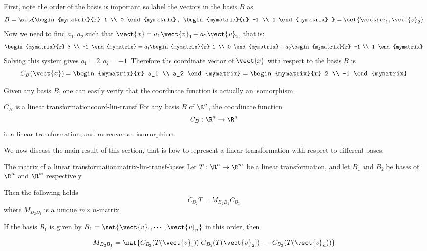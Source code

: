 \begin{solution}
First, note the order of the basis is important so label the vectors in the basis $B$ as 
\[
B = \set{\begin{mymatrix}{r}
1 \\
0 
\end{mymatrix}, \begin{mymatrix}{r}
-1 \\
1
\end{mymatrix} } = \set{\vect{v}_1, \vect{v}_2 } \]
Now we need to find $a_1, a_2$ such that $\vect{x} = a_1 \vect{v}_1 + a_2 \vect{v}_2$, that is:
\[
\begin{mymatrix}{r}
3 \\
-1
\end{mymatrix}
=
a_1 
\begin{mymatrix}{r}
1 \\
0 
\end{mymatrix}
+ a_2
\begin{mymatrix}{r}
-1 \\
1 
\end{mymatrix}\]
Solving this system gives $a_1 = 2, a_2 = -1$. Therefore the coordinate vector of $\vect{x}$ with respect to the basis $B$ is 
\[
C_B(\vect{x})
=
\begin{mymatrix}{r}
a_1 \\
a_2 
\end{mymatrix}
= \begin{mymatrix}{r}
2 \\
-1 
\end{mymatrix}
\]
\end{solution}

Given any basis $B$, one can easily verify that the coordinate function is actually an isomorphism. 

\begin{theorem}{$C_B$ is a linear transformation}{coord-lin-transf}
For any basis $B$ of $\R^n$, the coordinate function
\[ C_B: \R^n  \rightarrow \R^n  \]
is a linear transformation, and moreover an isomorphism. 
\end{theorem}

We now discuss the main  result  of this section, that is how
to represent a linear transformation with respect to different
bases.

\begin{theorem}{The matrix of a linear transformation}{matrix-lin-transf-bases}
Let $T: \R^n \to \R^m$ be a linear transformation,
and let $B_1$ and $B_2$ be bases of $\R^{n}$ and
$\R^{m}$ respectively.

Then the following holds
\begin{equation}
C_{B_2} T = M_{B_{2} B_{1}} C_{B_1}   \label{matrix-equation}
\end{equation}
where $M_{B_{2} B_{1}}$  is a unique $m \times n$-matrix.

If the basis $B_1$ is given by $B_1=\set{\vect{v}_1, \cdots, \vect{v}_n}$ in this order, then 

\[  M_{B_{2} B_{1}} = \mat{C_{B_2}(T(\vect{v}_1)) \; C_{B_2}(T(\vect{v}_2)) \; \cdots C_{B_2}(T(\vect{v}_n)) } \]
\end{theorem}


